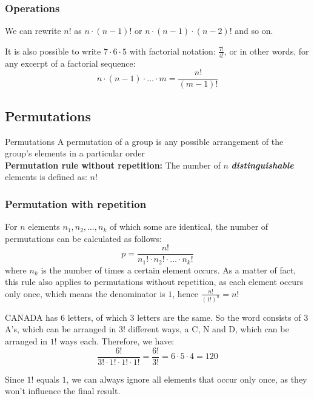 \subsubsection{Operations}
We can rewrite $n!$ as $n \cdot (n - 1)!$ or $n \cdot (n - 1) \cdot (n - 2)!$ and so on.

It is also possible to write $7 \cdot 6 \cdot 5$ with factorial notation: $\displaystyle \frac{7!}{4!}$, or in other words, for any excerpt of a factorial sequence: \[n \cdot (n - 1) \cdot \ldots \cdot m = \frac{n!}{(m - 1)!}\]


\subsection{Permutations}
\begin{definition}[]{Permutations}
    A permutation of a group is any possible arrangement of the group's elements in a particular order\\

    \textbf{Permutation rule without repetition:} The number of $n$ \textbf{\textit{distinguishable}} elements is defined as: $n!$
\end{definition}


\subsubsection{Permutation with repetition}
For $n$ elements $n_1,n_2,\ldots,n_k$ of which some are identical, the number of permutations can be calculated as follows:
\[
    p = \frac{n!}{n_1! \cdot n_2! \cdot \ldots \cdot n_k!}
\]
where $n_k$ is the number of times a certain element occurs. 
As a matter of fact, this rule also applies to permutations without repetition, as each element occurs only once, which means the denominator is $1$, hence $\displaystyle \frac{n!}{(1!)^n} = n!$

\inlineex \smallhspace CANADA has $6$ letters, of which $3$ letters are the same. So the word consists of $3$ A's, which can be arranged in $3!$ different ways, a C, N and D, which can be arranged in $1!$ ways each. Therefore, we have:
\[
    \frac{6!}{3!\cdot 1! \cdot 1! \cdot 1!} = \frac{6!}{3!} = 6 \cdot 5 \cdot 4 = 120
\]

Since $1!$ equals $1$, we can always ignore all elements that occur only once, as they won't influence the final result.


\newpage

